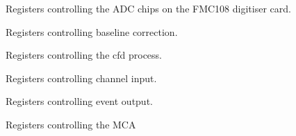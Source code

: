 \documentclass[letterpaper,10pt,english]{sphinxmanual}
\begin{document}
\begin{fulllineitems}
\begin{fulllineitems}
\label{\detokenize{tes:tes.registers.Registers.adc}}
\sphinxAtStartPar
Registers controlling the ADC chips on the FMC108 digitiser
card.

\end{fulllineitems}


\begin{fulllineitems}
\label{\detokenize{tes:tes.registers.Registers.baseline}}
\sphinxAtStartPar
Registers controlling baseline correction.

\end{fulllineitems}


\begin{fulllineitems}
\label{\detokenize{tes:tes.registers.Registers.cfd}}
\sphinxAtStartPar
Registers controlling the cfd process.

\end{fulllineitems}


\begin{fulllineitems}
\label{\detokenize{tes:tes.registers.Registers.channel}}
\sphinxAtStartPar
Registers controlling channel input.

\end{fulllineitems}


\begin{fulllineitems}
\label{\detokenize{tes:tes.registers.Registers.event}}
\sphinxAtStartPar
Registers controlling event output.

\end{fulllineitems}


\begin{fulllineitems}
\label{\detokenize{tes:tes.registers.Registers.mca}}
\sphinxAtStartPar
Registers controlling the MCA

\end{fulllineitems}


\end{fulllineitems}
\end{document}
